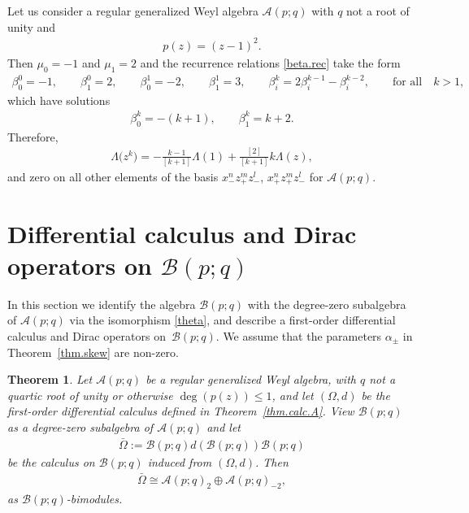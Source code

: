 \documentclass[10pt,a4paper]{amsart}
\numberwithin{equation}{section}
\newtheorem{Theorem}{Theorem}[section]
\def\Weyl#1#2{{\mathcal{B}}(#1;#2)}
\def\AWeyl#1#2{{\mathcal{A}}(#1;#2)}
\begin{document}
\begin{Example}\label{ex.lambda.2}
Let us consider a regular generalized Weyl algebra $\AWeyl p q$ with $q$ not a root of unity and
\begin{gather*}
p(z) = (z -1)^2.
\end{gather*}
Then $\mu_0 = -1$ and $\mu_1 = 2$ and the recurrence relations \eqref{beta.rec} take the form
\begin{gather*}
\beta^0_0 = -1, \!\qquad \beta^0_1 = 2 , \!\qquad \beta^1_0 = -2, \!\qquad \beta^1_1 = 3, \!\qquad \beta^k_i = 2\beta^{k-1}_i - \beta^{k-2}_i, \!\qquad \mbox{for all}
\quad k>1,
\end{gather*}
which have solutions
\begin{gather*}
\beta^k_0 = -(k+1), \qquad \beta^k_1 = k+2.
\end{gather*}
Therefore,
\begin{gather*}
\Lambda \big(z^k\big) = -\frac{k-1}{[k +1]} \Lambda (1)+ \frac{[2] }{[k +1]}k \Lambda (z),
\end{gather*}
and zero on all other elements of the basis $x_-^nz_+^mz_-^l$, $x_+^nz_+^mz_-^l$ for $\AWeyl p q$.
\end{Example}

\section[Dif\/ferential calculus and Dirac operators on ${\mathcal B}(p;q)$]{Dif\/ferential calculus and Dirac operators on $\Weyl p q$}\label{sec.diff.b}
In this section we identify the algebra $\Weyl p q$ with the degree-zero subalgebra of $\AWeyl p q$ via the isomorphism \eqref{theta}, and describe a f\/irst-order dif\/ferential calculus and Dirac operators on~$\Weyl p q$. We assume that the parameters $\alpha_\pm$ in Theorem~\ref{thm.skew} are non-zero.


\begin{Theorem}\label{thm.calc.B}
Let $\AWeyl p q$ be a regular generalized Weyl algebra, with $q$ not a quartic root of unity or otherwise $\deg(p(z)) \leq 1$, and let $(\Omega ,d)$ be the first-order differential calculus defined in Theorem~{\rm \ref{thm.calc.A}}. View $\Weyl p q$ as a degree-zero subalgebra of $\AWeyl p q$ and let
\begin{gather*}
\bar\Omega := \Weyl p q d (\Weyl p q ) \Weyl p q
\end{gather*}
be the calculus on $\Weyl p q$ induced from $(\Omega ,d)$. Then
\begin{gather}\label{bomega}
\bar\Omega \cong \AWeyl p q_{2} \oplus \AWeyl p q_{-2},
\end{gather}
as $\Weyl p q$-bimodules.
\end{Theorem}
\end{document}
